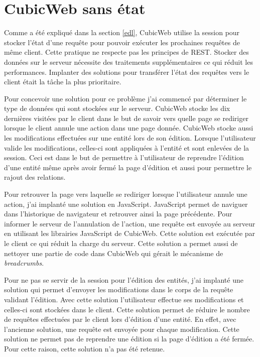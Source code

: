 \section{CubicWeb sans état}
Comme a été expliqué dans la section \ref{edl}, CubicWeb utilise la session pour stocker l'état d'une requête pour pouvoir exécuter les prochaines requêtes de même client. Cette pratique ne respecte pas les principes de REST. Stocker des données sur le serveur nécessite des traitements supplémentaires ce qui réduit les performances. Implanter des solutions pour transférer l'état des requêtes vers le client était la tâche la plus prioritaire.

Pour concevoir une solution pour ce problème j'ai commencé par déterminer le type de données qui sont stockées sur le serveur. CubicWeb stocke les dix dernières  visitées par le client dans le but de savoir vers quelle page se rediriger lorsque le client annule une action dans une page donnée. CubicWeb stocke aussi les modifications effectuées sur une entité lors de son édition. Lorsque l'utilisateur valide les modifications, celles-ci sont appliquées à l'entité et sont enlevées de la session. Ceci est dans le but de permettre à l'utilisateur de reprendre l'édition d'une entité même après avoir fermé la page d'édition et aussi pour permettre le rajout des relations. 

Pour retrouver la page vers laquelle se rediriger lorsque l'utilisateur annule une action, j'ai implanté une solution en JavaScript. JavaScript permet de naviguer dans l'historique de navigateur et retrouver ainsi la page précédente. Pour informer le serveur de l'annulation de l'action, une requête  est envoyée au serveur en utilisant les librairies JavaScript de CubicWeb. Cette solution est exécutée par le client ce qui réduit la charge du serveur. Cette solution a permet aussi de nettoyer une partie de code dans CubicWeb qui gérait le mécanisme de \textit{breadcrumbs}.

Pour ne pas se servir de la session pour l'édition des entités, j'ai implanté une solution qui permet d'envoyer les modifications dans le corps de la requête validant l'édition. Avec cette solution l'utilisateur effectue ses modifications et celles-ci sont stockées dans le client. Cette solution permet de réduire le nombre de requêtes effectuées par le client lors d'édition d'une entité. En effet, avec l'ancienne solution, une requête est envoyée pour chaque modification. Cette solution ne permet pas de reprendre une édition si la page d'édition a été fermée. Pour cette raison, cette solution n'a pas été retenue.

